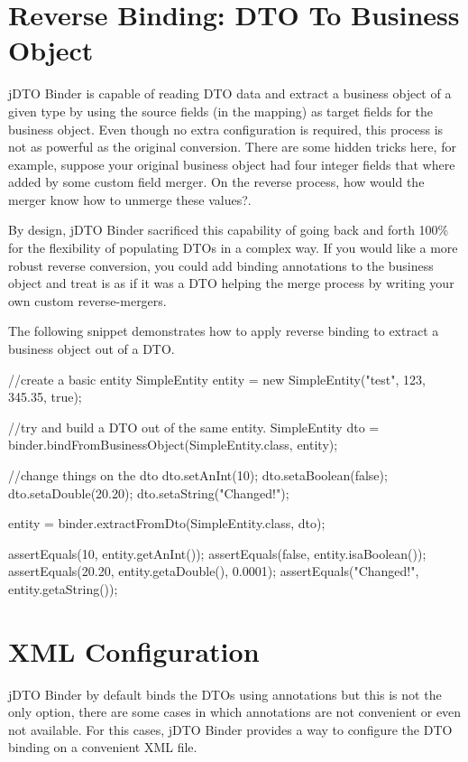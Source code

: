 \documentclass[11pt]{article}
\newcommand{\JDTO}{jDTO Binder\xspace}
\begin{document}
\section{Reverse Binding: DTO To Business Object}

\JDTO is capable of reading DTO data and extract a business object of a given type by using the source fields (in the mapping) as target fields for the business object. Even though no extra configuration is required, this process is not as powerful as the original conversion. There are some hidden tricks here, for example, suppose your original business object had four integer fields that where added by some custom field merger. On the reverse process, how would the merger know how to unmerge these values?. 

By design, \JDTO sacrificed this capability of going back and forth 100\% for the flexibility of populating DTOs in a complex way. If you would like a more robust reverse conversion, you could add binding annotations to the business object and treat is as if it was a DTO helping the merge process by writing your own custom reverse-mergers.

The following snippet demonstrates how to apply reverse binding to extract a business object out of a DTO.



\begin{java}
//create a basic entity
SimpleEntity entity = new SimpleEntity("test", 123, 345.35, true);

//try and build a DTO out of the same entity.
SimpleEntity dto = 
    binder.bindFromBusinessObject(SimpleEntity.class, entity);

//change things on the dto
dto.setAnInt(10);
dto.setaBoolean(false);
dto.setaDouble(20.20);
dto.setaString("Changed!");

entity = binder.extractFromDto(SimpleEntity.class, dto);


assertEquals(10, entity.getAnInt());
assertEquals(false, entity.isaBoolean());
assertEquals(20.20, entity.getaDouble(), 0.0001);
assertEquals("Changed!", entity.getaString());
\end{java}



\section{XML Configuration}

\JDTO by default binds the DTOs using annotations but this is not the only option, there are some cases in which annotations are not convenient or even not available. For this cases, \JDTO provides a way to configure the DTO binding on a convenient XML file.
\end{document}
